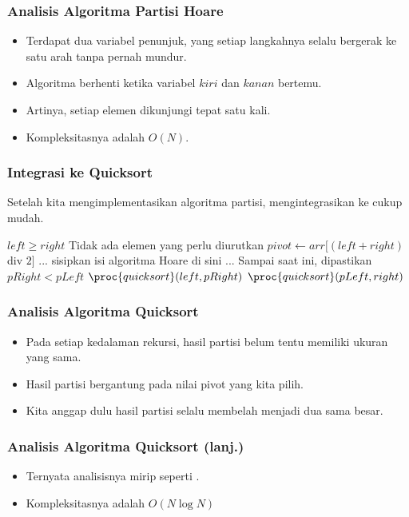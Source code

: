 \begin{frame}
\frametitle{Analisis Algoritma Partisi Hoare}
\begin{itemize}
  \item Terdapat dua variabel penunjuk, yang setiap langkahnya selalu bergerak ke satu arah tanpa pernah mundur.
  \item Algoritma berhenti ketika variabel $kiri$ dan $kanan$ bertemu.
  \item Artinya, setiap elemen \farray dikunjungi tepat satu kali.
  \item Kompleksitasnya adalah $O(N)$.
\end{itemize}
\end{frame}

\begin{frame}
\frametitle{Integrasi ke Quicksort}
Setelah kita mengimplementasikan algoritma partisi, mengintegrasikan ke \fquickSort cukup mudah.
\begin{codebox}
\li \If $left \geq right$ \Then 
\li   \Comment Tidak ada elemen yang perlu diurutkan
\li \Else
\li    $pivot \gets arr[(left + right)$ div $2]$
\zi
\li    \Comment ... sisipkan isi algoritma Hoare di sini ...
\li    \Comment Sampai saat ini, dipastikan $pRight < pLeft$
\zi
\li    $\proc{quicksort}(left, pRight)$
\li    $\proc{quicksort}(pLeft, right)$
    \End
\end{codebox}
\end{frame}

\begin{frame}
\frametitle{Analisis Algoritma Quicksort}
\begin{itemize}
  \item Pada setiap kedalaman rekursi, \farray hasil partisi belum tentu memiliki ukuran yang sama.
  \item Hasil partisi bergantung pada nilai pivot yang kita pilih.
  \item Kita anggap dulu hasil partisi selalu membelah \farray menjadi dua \fsubarray sama besar.
\end{itemize}
\end{frame}

\begin{frame}
\frametitle{Analisis Algoritma Quicksort (lanj.)}
\begin{itemize}
  \item Ternyata analisisnya mirip seperti \fmergeSort.
  \item Kompleksitasnya adalah $O(N \log{N})$
\end{itemize}

\end{frame}

